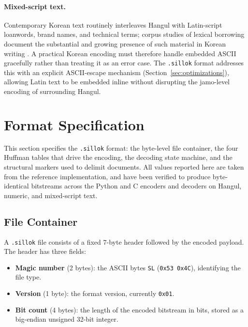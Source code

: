 \documentclass[conference]{IEEEtran}
\begin{document}
\paragraph{Mixed-script text.} Contemporary Korean text routinely interleaves
Hangul with Latin-script loanwords, brand names, and technical terms; corpus
studies of lexical borrowing document the substantial and growing presence of
such material in Korean writing \cite{loanwords}. A practical Korean encoding
must therefore handle embedded ASCII gracefully rather than treating it as an
error case. The \texttt{.sillok} format addresses this with an explicit
ASCII-escape mechanism (Section~\ref{sec:optimizations}), allowing Latin text
to be embedded inline without disrupting the jamo-level encoding of
surrounding Hangul.

\section{Format Specification}
\label{sec:format}

This section specifies the \texttt{.sillok} format: the byte-level file
container, the four Huffman tables that drive the encoding, the decoding
state machine, and the structural markers used to delimit documents. All
values reported here are taken from the reference implementation, and have
been verified to produce byte-identical bitstreams across the Python and C
encoders and decoders on Hangul, numeric, and mixed-script text.

\subsection{File Container}

A \texttt{.sillok} file consists of a fixed 7-byte header followed by the
encoded payload. The header has three fields:

\begin{itemize}
    \item \textbf{Magic number} (2 bytes): the ASCII bytes \texttt{SL}
    (\texttt{0x53 0x4C}), identifying the file type.
    \item \textbf{Version} (1 byte): the format version, currently
    \texttt{0x01}.
    \item \textbf{Bit count} (4 bytes): the length of the encoded bitstream
    in bits, stored as a big-endian unsigned 32-bit integer.
\end{itemize}
\end{document}
